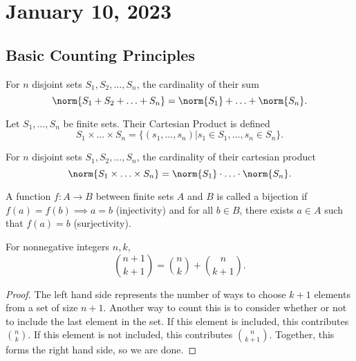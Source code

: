 \section{January 10, 2023}

\subsection{Basic Counting Principles}

\begin{theorem}

For $n$ disjoint sets $S_1, S_2, \hdots, S_n$, the cardinality of their sum 
\[\norm{S_1 + S_2 + \hdots + S_n} = \norm{S_1} + \hdots + \norm{S_n}.\]
\end{theorem}

\begin{definition}

Let $S_1, \hdots, S_n$ be finite sets. Their \ac{Cartesian Product} is defined 
\[S_1\times \hdots \times S_n = \{(s_1, \hdots, s_n)\vert s_1\in S_1, \hdots, s_n\in S_n\}.\]
\end{definition}

\begin{theorem}

For $n$ disjoint sets $S_1, S_2, \hdots, S_n$, the cardinality of their cartesian product 
\[\norm{S_1 \times \hdots \times S_n} = \norm{S_1} \cdot \hdots \cdot \norm{S_n}.\]
\end{theorem}

\begin{definition}

A function $f: A\rightarrow B$ between finite sets $A$ and $B$ is called a \ac{bijection} if $f(a)=f(b)\implies a=b$ (injectivity) and for all $b\in B$, there exists $a\in A$ such that $f(a) = b$ (surjectivity).
\end{definition}

\begin{theorem}

For nonnegative integers $n,k$, 
\[\binom{n+1}{k+1} = \binom{n}{k} + \binom{n}{k+1}.\]
\end{theorem}

\begin{proof}
    The left hand side represents the number of ways to choose $k+1$ elements from a set of size $n+1$. Another way to count this is to consider whether or not to include the last element in the set. If this element is included, this contributes $\binom{n}{k}$. If this element is not included, this contributes $\binom{n}{k+1}$. Together, this forms the right hand side, so we are done. 
\end{proof}

